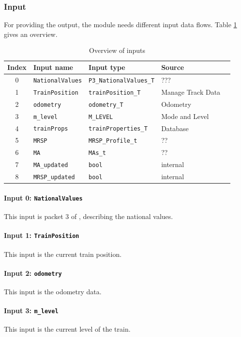\subsubsection{Input}
For providing the output, the module needs different input data flows. Table \ref{tbl:speedsupervisionInput} gives an overview.

\begin{table}[H]
  \begin{tabular}{| c | l | l | l | l |}
    \hline
    \textbf{Index} & \textbf{Input name} & \textbf{Input type} & \textbf{Source}\\ \hline
    0 & \texttt{NationalValues} & \texttt{P3\_NationalValues\_T} & ???\\
    1 & \texttt{TrainPosition} & \texttt{trainPosition\_T} & Manage Track Data\\
    2 & \texttt{odometry} & \texttt{odometry\_T} & Odometry\\
    3 & \texttt{m\_level} & \texttt{M\_LEVEL} & Mode and Level\\
    4 & \texttt{trainProps} & \texttt{trainProperties\_T} & Database\\
    5 & \texttt{MRSP} & \texttt{MRSP\_Profile\_t} & ?? \\
    6 & \texttt{MA} & \texttt{MAs\_t} & ??\\
    7 & \texttt{MA\_updated} & \texttt{bool} & internal\\
    8 & \texttt{MRSP\_updated} & \texttt{bool} & internal\\
    \hline
  \end{tabular} 
  \caption{Overview of inputs}
  \label{tbl:speedsupervisionInput}
\end{table}

\paragraph{Input 0: \texttt{NationalValues}}
This input is packet 3 of \cite[Chapt.~8]{subset-026}, describing the national values. 
\paragraph{Input 1: \texttt{TrainPosition}}
This input is the current train position.
\paragraph{Input 2: \texttt{odometry}}
This input is the odometry data.
\paragraph{Input 3: \texttt{m\_level}}
This input is the current level of the train.

